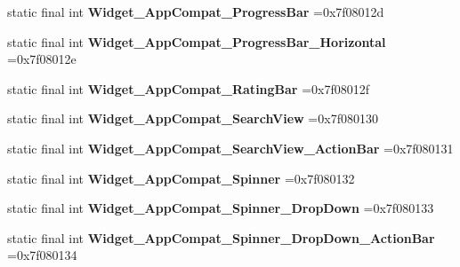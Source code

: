 \begin{DoxyCompactItemize}
\item 
\hypertarget{classcheck_1_1test_1_1_r_1_1style_a6f668203e5196b4b410a0d5e1a6367d9}{}static final int {\bfseries Widget\+\_\+\+App\+Compat\+\_\+\+Progress\+Bar} =0x7f08012d\label{classcheck_1_1test_1_1_r_1_1style_a6f668203e5196b4b410a0d5e1a6367d9}

\item 
\hypertarget{classcheck_1_1test_1_1_r_1_1style_ae93730d21dae36ee7f3b93c4ea4ec141}{}static final int {\bfseries Widget\+\_\+\+App\+Compat\+\_\+\+Progress\+Bar\+\_\+\+Horizontal} =0x7f08012e\label{classcheck_1_1test_1_1_r_1_1style_ae93730d21dae36ee7f3b93c4ea4ec141}

\item 
\hypertarget{classcheck_1_1test_1_1_r_1_1style_a2ce0e7a8375957a692200755a41244e6}{}static final int {\bfseries Widget\+\_\+\+App\+Compat\+\_\+\+Rating\+Bar} =0x7f08012f\label{classcheck_1_1test_1_1_r_1_1style_a2ce0e7a8375957a692200755a41244e6}

\item 
\hypertarget{classcheck_1_1test_1_1_r_1_1style_a50dc4f9931c9891c8cd72fc26f8fc549}{}static final int {\bfseries Widget\+\_\+\+App\+Compat\+\_\+\+Search\+View} =0x7f080130\label{classcheck_1_1test_1_1_r_1_1style_a50dc4f9931c9891c8cd72fc26f8fc549}

\item 
\hypertarget{classcheck_1_1test_1_1_r_1_1style_af5451e4a84294182724b3be61cf97f86}{}static final int {\bfseries Widget\+\_\+\+App\+Compat\+\_\+\+Search\+View\+\_\+\+Action\+Bar} =0x7f080131\label{classcheck_1_1test_1_1_r_1_1style_af5451e4a84294182724b3be61cf97f86}

\item 
\hypertarget{classcheck_1_1test_1_1_r_1_1style_a6083ec8546d98ca321bf12ed87d836e6}{}static final int {\bfseries Widget\+\_\+\+App\+Compat\+\_\+\+Spinner} =0x7f080132\label{classcheck_1_1test_1_1_r_1_1style_a6083ec8546d98ca321bf12ed87d836e6}

\item 
\hypertarget{classcheck_1_1test_1_1_r_1_1style_a50029841ab59954eca865c4a20dc8475}{}static final int {\bfseries Widget\+\_\+\+App\+Compat\+\_\+\+Spinner\+\_\+\+Drop\+Down} =0x7f080133\label{classcheck_1_1test_1_1_r_1_1style_a50029841ab59954eca865c4a20dc8475}

\item 
\hypertarget{classcheck_1_1test_1_1_r_1_1style_a8b887a7249260fbd83b1f7ad0aedc711}{}static final int {\bfseries Widget\+\_\+\+App\+Compat\+\_\+\+Spinner\+\_\+\+Drop\+Down\+\_\+\+Action\+Bar} =0x7f080134\label{classcheck_1_1test_1_1_r_1_1style_a8b887a7249260fbd83b1f7ad0aedc711}


\end{DoxyCompactItemize}
